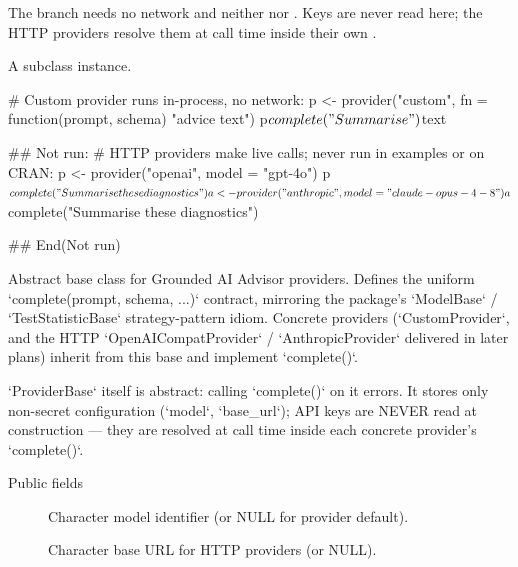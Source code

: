 \documentclass[a4paper]{book}
\begin{document}
%
\begin{Details}
The  branch needs no network and neither  nor
. Keys are never read here; the HTTP providers resolve them at
call time inside their own .
\end{Details}
%
\begin{Value}
A  subclass instance.
\end{Value}
%
\begin{Examples}
\begin{ExampleCode}
# Custom provider runs in-process, no network:
p <- provider("custom", fn = function(prompt, schema) "advice text")
p$complete("Summarise")$text

## Not run: 
# HTTP providers make live calls; never run in examples or on CRAN:
p <- provider("openai", model = "gpt-4o")
p$complete("Summarise these diagnostics")

a <- provider("anthropic", model = "claude-opus-4-8")
a$complete("Summarise these diagnostics")

## End(Not run)
\end{ExampleCode}
\end{Examples}
%
\begin{Description}
Abstract base class for Grounded AI Advisor providers. Defines the
uniform `complete(prompt, schema, ...)` contract, mirroring the package's
`ModelBase` / `TestStatisticBase` strategy-pattern idiom. Concrete providers
(`CustomProvider`, and the HTTP `OpenAICompatProvider` / `AnthropicProvider`
delivered in later plans) inherit from this base and implement `complete()`.

`ProviderBase` itself is abstract: calling `complete()` on it errors. It
stores only non-secret configuration (`model`, `base\_url`); API keys are
NEVER read at construction — they are resolved at call time inside each
concrete provider's `complete()`.
\end{Description}
%
\begin{Section}{Public fields}

\begin{description}

\item[] Character model identifier (or NULL for provider default).

\item[] Character base URL for HTTP providers (or NULL).

\end{description}


\end{Section}
\end{document}
